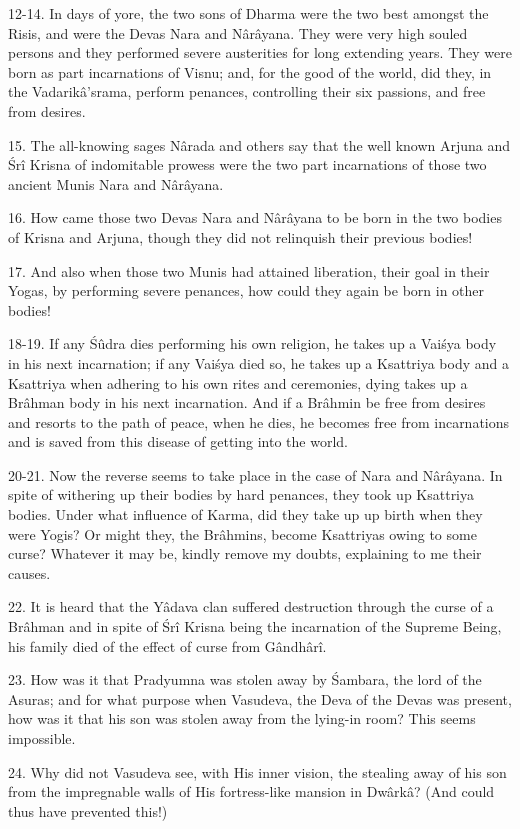 12-14. In days of yore, the two sons of Dharma were the two best amongst the Risis, and were the Devas Nara and N\^ar\^ayana. They were very high souled persons and they performed severe austerities for long extending years. They were born as part incarnations of Visnu; and, for the good of the world, did they, in the Vadarik\^a'srama, perform penances, controlling their six passions, and free from desires.

15. The all-knowing sages N\^arada and others say that the well known Arjuna and \'Sr\^i Krisna of indomitable prowess were the two part incarnations of those two ancient Munis Nara and N\^ar\^ayana.

16. How came those two Devas Nara and N\^ar\^ayana to be born in the two bodies of Krisna and Arjuna, though they did not relinquish their previous bodies!

17. And also when those two Munis had attained liberation, their goal in their Yogas, by performing severe penances, how could they again be born in other bodies!

18-19. If any \'Sûdra dies performing his own religion, he takes up a Vai\'sya body in his next incarnation; if any Vai\'sya died so, he takes up a Ksattriya body and a Ksattriya when adhering to his own rites and ceremonies, dying takes up a Br\^ahman body in his next incarnation. And if a Br\^ahmin be free from desires and resorts to the path of peace, when he dies, he becomes free from incarnations and is saved from this disease of getting into the world.

20-21. Now the reverse seems to take place in the case of Nara and N\^ar\^ayana. In spite of withering up their bodies by hard penances, they took up Ksattriya bodies. Under what influence of Karma, did they take up up birth when they were Yogis? Or might they, the Br\^ahmins, become Ksattriyas owing to some curse? Whatever it may be, kindly remove my doubts, explaining to me their causes.

22. It is heard that the Y\^adava clan suffered destruction through the curse of a Br\^ahman and in spite of \'Sr\^i Krisna being the incarnation of the Supreme Being, his family died of the effect of curse from G\^andh\^ar\^i.

23. How was it that Pradyumna was stolen away by \'Sambara, the lord of the Asuras; and for what purpose when Vasudeva, the Deva of the Devas was present, how was it that his son was stolen away from the lying-in room? This seems impossible.

24. Why did not Vasudeva see, with His inner vision, the stealing away of his son from the impregnable walls of His fortress-like mansion in Dw\^ark\^a? (And could thus have prevented this!)

